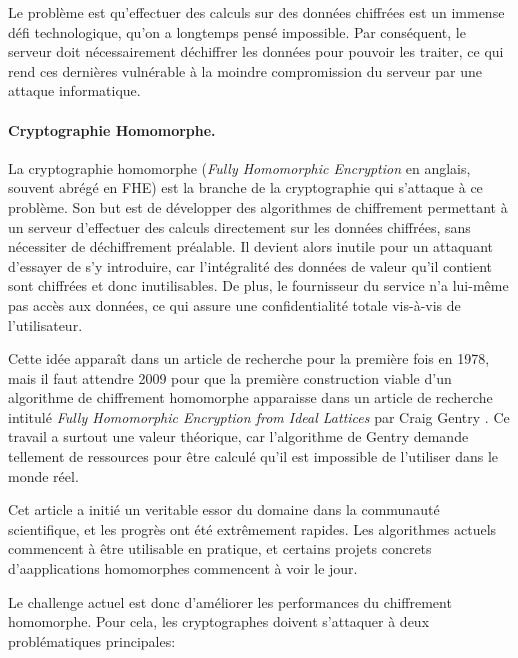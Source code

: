 Le problème est qu'effectuer des calculs sur des données chiffrées est un immense défi technologique, qu'on a longtemps pensé impossible. Par conséquent, le serveur doit nécessairement déchiffrer les données pour pouvoir les traiter, ce qui rend ces dernières vulnérable à la moindre compromission du serveur par une attaque informatique.


\paragraph{Cryptographie Homomorphe.}
La cryptographie homomorphe (\textit{Fully Homomorphic Encryption} en anglais, souvent abrégé en \gls{FHE}) est la branche de la cryptographie qui s'attaque à ce problème. Son but est de développer des algorithmes de chiffrement permettant à un serveur d'effectuer des calculs directement sur les données chiffrées, sans nécessiter de déchiffrement préalable. Il devient alors inutile pour un attaquant d'essayer de s'y introduire, car l'intégralité des données de valeur qu'il contient sont chiffrées et donc inutilisables. De plus, le fournisseur du service n'a lui-même pas accès aux données, ce qui assure une confidentialité totale vis-à-vis de l'utilisateur.

Cette idée apparaît dans un article de recherche pour la première fois en 1978, mais il faut attendre 2009 pour que la première construction viable d'un algorithme de chiffrement homomorphe apparaisse dans un article de recherche intitulé \textit{Fully Homomorphic Encryption from Ideal Lattices} par Craig Gentry \cite{STOC:Gentry09}. Ce travail a surtout une valeur théorique, car l'algorithme de Gentry demande tellement de ressources pour être calculé qu'il est impossible de l'utiliser dans le monde réel.

Cet article a initié un veritable essor du domaine dans la communauté scientifique, et les progrès ont été extrêmement rapides. Les algorithmes actuels commencent à être utilisable en pratique, et certains projets concrets d'aapplications homomorphes commencent à voir le jour.

Le challenge actuel est donc d'améliorer les performances du chiffrement homomorphe. Pour cela, les cryptographes doivent s'attaquer à deux problématiques principales:

